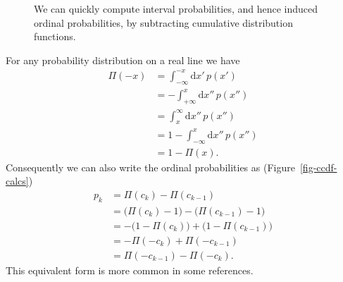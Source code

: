 \documentclass[
  letterpaper,
  DIV=11,
  numbers=noendperiod]{scrartcl}
\begin{document}
\begin{figure}


\caption{\label{fig-cdf-calcs}We can quickly compute interval
probabilities, and hence induced ordinal probabilities, by subtracting
cumulative distribution functions.}

\end{figure}%

For any probability distribution on a real line we have \begin{align*}
\Pi(-x)
&=
\int_{-\infty}^{-x} \mathrm{d} x' \, p(x')
\\
&=
-\int_{+\infty}^{x} \mathrm{d} x'' \, p(x'')
\\
&=
\int_{x}^{\infty} \mathrm{d} x'' \, p(x'')
\\
&=
1 - \int_{-\infty}^{x} \mathrm{d} x'' \, p(x'')
\\
&=
1 - \Pi(x).
\end{align*} Consequently we can also write the ordinal probabilities as
(Figure~\ref{fig-ccdf-calcs}) \begin{align*}
p_{k}
&=
\Pi(c_{k}) - \Pi(c_{k - 1})
\\
&=
\big( \Pi(c_{k}) - 1 \big) - \big( \Pi(c_{k - 1}) - 1 \big)
\\
&=
- \big( 1 - \Pi(c_{k}) \big) + \big( 1 - \Pi(c_{k - 1}) \big)
\\
&=
- \Pi(-c_{k}) + \Pi(-c_{k - 1})
\\
&=
\Pi(-c_{k - 1}) - \Pi(-c_{k}).
\end{align*} This equivalent form is more common in some references.
\end{document}
